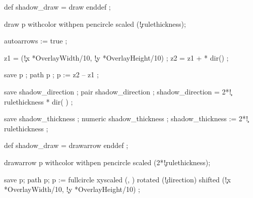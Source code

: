   def shadow_draw = draw enddef ;

  \fi

  draw p withcolor  
       withpen pencircle scaled (\simpleslidesPictureParameter\c!rulethickness);

\stopuseMPgraphic


  autoarrows := true ; %

  z1 = (\simpleslidesPictureParameter\c!x *OverlayWidth/10,
        \simpleslidesPictureParameter\c!y *OverlayHeight/10)   ;
  z2 = z1 +  *
            dir() ;

  save p ; path p ;
  p := z2 -- z1 ;

  \ifcase \simpleslidesShadow \else
  save shadow_direction ; pair shadow_direction ;
  shadow_direction = 2*\simpleslidesPictureParameter\c!rulethickness * 
     dir(%
     \ifcase \simpleslidesShadow {}    \fi ) ;

  save shadow_thickness ; numeric shadow_thickness ;
  shadow_thickness := 2*\simpleslidesPictureParameter\c!rulethickness ;

  def shadow_draw = drawarrow enddef ;

  \fi

  drawarrow p
       withcolor  
       withpen pencircle scaled (2*\simpleslidesPictureParameter\c!rulethickness);

\stopuseMPgraphic


  save p; path p;
  p := fullcircle xyscaled 
        (\simpleslidesCurrentXscale, \simpleslidesCurrentYscale)
       rotated (\simpleslidesPictureParameter\c!direction) 
       shifted
       (\simpleslidesPictureParameter\c!x *OverlayWidth/10,
        \simpleslidesPictureParameter\c!y *OverlayHeight/10)  ;

